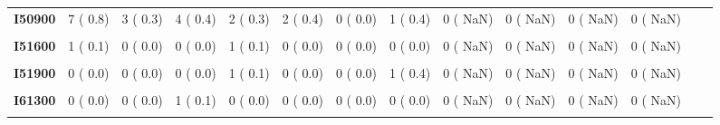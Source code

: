 \documentclass[
]{article}
\begin{document}
\begin{table}[H]
\begin{tabular}[t]{>{\raggedright\arraybackslash}p{5em}ccccccccccccc}
\textbf{I50900} & 7 (  0.8) & 3 (  0.3) & 4 (  0.4) & 2 (  0.3) & 2 (  0.4) & 0 (  0.0) & 1 (  0.4) & 0 (  NaN) & 0 (  NaN) & 0 (  NaN) & 0 (  NaN) &  & \\
\textbf{\cellcolor{gray!10}{I51300}} & \cellcolor{gray!10}{0 (  0.0)} & \cellcolor{gray!10}{0 (  0.0)} & \cellcolor{gray!10}{0 (  0.0)} & \cellcolor{gray!10}{1 (  0.1)} & \cellcolor{gray!10}{0 (  0.0)} & \cellcolor{gray!10}{0 (  0.0)} & \cellcolor{gray!10}{0 (  0.0)} & \cellcolor{gray!10}{0 (  NaN)} & \cellcolor{gray!10}{0 (  NaN)} & \cellcolor{gray!10}{0 (  NaN)} & \cellcolor{gray!10}{0 (  NaN)} & \cellcolor{gray!10}{} & \cellcolor{gray!10}{}\\
\textbf{I51600} & 1 (  0.1) & 0 (  0.0) & 0 (  0.0) & 1 (  0.1) & 0 (  0.0) & 0 (  0.0) & 0 (  0.0) & 0 (  NaN) & 0 (  NaN) & 0 (  NaN) & 0 (  NaN) &  & \\
\textbf{\cellcolor{gray!10}{I51800}} & \cellcolor{gray!10}{5 (  0.5)} & \cellcolor{gray!10}{1 (  0.1)} & \cellcolor{gray!10}{1 (  0.1)} & \cellcolor{gray!10}{1 (  0.1)} & \cellcolor{gray!10}{0 (  0.0)} & \cellcolor{gray!10}{1 (  0.4)} & \cellcolor{gray!10}{1 (  0.4)} & \cellcolor{gray!10}{0 (  NaN)} & \cellcolor{gray!10}{0 (  NaN)} & \cellcolor{gray!10}{0 (  NaN)} & \cellcolor{gray!10}{0 (  NaN)} & \cellcolor{gray!10}{} & \cellcolor{gray!10}{}\\
\textbf{I51900} & 0 (  0.0) & 0 (  0.0) & 0 (  0.0) & 1 (  0.1) & 0 (  0.0) & 0 (  0.0) & 1 (  0.4) & 0 (  NaN) & 0 (  NaN) & 0 (  NaN) & 0 (  NaN) &  & \\
\textbf{\cellcolor{gray!10}{I61000}} & \cellcolor{gray!10}{0 (  0.0)} & \cellcolor{gray!10}{0 (  0.0)} & \cellcolor{gray!10}{1 (  0.1)} & \cellcolor{gray!10}{0 (  0.0)} & \cellcolor{gray!10}{0 (  0.0)} & \cellcolor{gray!10}{0 (  0.0)} & \cellcolor{gray!10}{0 (  0.0)} & \cellcolor{gray!10}{0 (  NaN)} & \cellcolor{gray!10}{0 (  NaN)} & \cellcolor{gray!10}{0 (  NaN)} & \cellcolor{gray!10}{0 (  NaN)} & \cellcolor{gray!10}{} & \cellcolor{gray!10}{}\\
\textbf{I61300} & 0 (  0.0) & 0 (  0.0) & 1 (  0.1) & 0 (  0.0) & 0 (  0.0) & 0 (  0.0) & 0 (  0.0) & 0 (  NaN) & 0 (  NaN) & 0 (  NaN) & 0 (  NaN) &  & \\
\textbf{\cellcolor{gray!10}{I61500}} & \cellcolor{gray!10}{0 (  0.0)} & \cellcolor{gray!10}{0 (  0.0)} & \cellcolor{gray!10}{0 (  0.0)} & \cellcolor{gray!10}{1 (  0.1)} & \cellcolor{gray!10}{0 (  0.0)} & \cellcolor{gray!10}{0 (  0.0)} & \cellcolor{gray!10}{0 (  0.0)} & \cellcolor{gray!10}{0 (  NaN)} & \cellcolor{gray!10}{0 (  NaN)} & \cellcolor{gray!10}{0 (  NaN)} & \cellcolor{gray!10}{0 (  NaN)} & \cellcolor{gray!10}{} & \cellcolor{gray!10}{}\\

\end{tabular}
\end{table}
\end{document}
